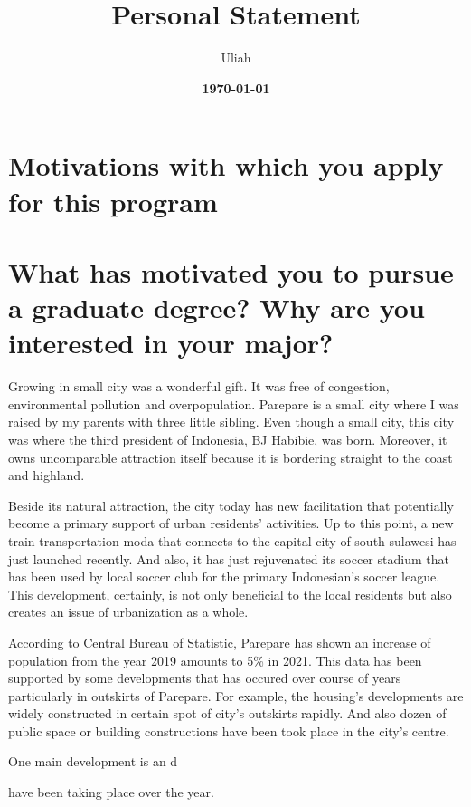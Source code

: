 \documentclass[11pt]{simart} %
\title{
\textbf{Personal Statement} \\
} %
\date{\textbf{\today}}
\author{Uliah}
\begin{document}
\maketitle %

\section{Motivations with which you apply for this program}
\section*{What has motivated you to pursue a graduate degree? Why are you interested in your major?}

Growing in small city was a wonderful gift. It was free of congestion, environmental pollution and overpopulation. Parepare is a small city where I was raised by my parents with three little sibling. Even though a small city, this city was where the third president of Indonesia, BJ Habibie, was born.
Moreover, it owns uncomparable attraction itself because it is bordering straight to the coast and highland.

Beside its natural attraction, the city today has new facilitation that potentially become a primary support of urban residents' activities.
Up to this point, a new train transportation moda that connects to the capital city of south sulawesi has just launched recently.
And also, it has just rejuvenated its soccer stadium that has been used by local soccer club for the primary Indonesian's soccer league.
This development, certainly, is not only beneficial to the local residents but also creates an issue of urbanization as a whole.

According to Central Bureau of Statistic, Parepare has shown an increase of population from the year 2019 amounts to 5\% in 2021. This data has been supported by some developments that has occured over course of years particularly in outskirts of Parepare. For example, the housing's developments are widely constructed in certain spot of city's outskirts rapidly. And also dozen of public space or building constructions have been took place in the city's centre.

One main development is an d

have been taking place over the year.
\end{document}

